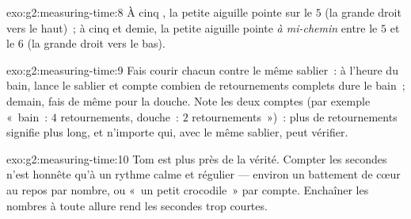 \begin{solution}{exo:g2:measuring-time:8}
À cinq , la petite aiguille pointe sur le $5$ (la grande droit
vers le haut)~; à cinq  et demie, la petite aiguille pointe
\emph{à mi-chemin} entre le $5$ et le $6$ (la grande droit vers le
bas).
\end{solution}

\begin{solution}{exo:g2:measuring-time:9}
Fais courir chacun contre le même sablier~: à l'heure du bain, lance
le sablier et compte combien de retournements complets dure le bain~;
demain, fais de même pour la douche. Note les deux comptes (par
exemple «~bain~: $4$ retournements, douche~: $2$ retournements~»)~:
plus de retournements signifie plus long, et n'importe qui, avec le
même sablier, peut vérifier.
\end{solution}

\begin{solution}{exo:g2:measuring-time:10}
Tom est plus près de la vérité. Compter les secondes n'est honnête
qu'à un rythme calme et régulier --- environ un battement de cœur au
repos par nombre, ou «~un petit crocodile~» par compte. Enchaîner les
nombres à toute allure rend les secondes trop courtes.
\end{solution}
